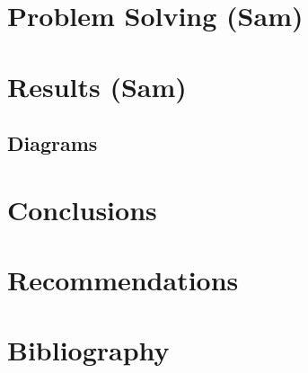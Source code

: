 \documentclass[letterpaper]{article}
\begin{document}
\section{Problem Solving (Sam)}
\label{sec:orgbfb056b}
\section{Results (Sam)}
\label{sec:orgf90db2a}
\subsection{Diagrams}
\label{sec:org35ea594}
\section{Conclusions}
\label{sec:orge8435b5}
\section{Recommendations}
\label{sec:org9f96e13}
\section{Bibliography}
\label{sec:orgba97043}
\end{document}
